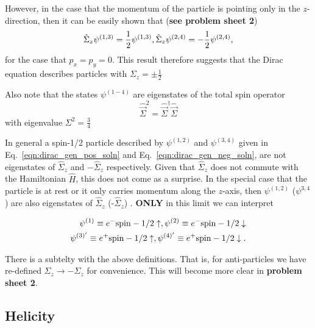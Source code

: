 However, in the case that the momentum of the particle is pointing only in the $z$-direction, then 
it can be easily shown that ({\bf see problem sheet 2})
\[
\hat{\Sigma}_{z}\psi^{(1,3)}=\frac{1}{2}\psi^{(1,3)},\\
\hat{\Sigma}_{z}\psi^{(2,4)}=-\frac{1}{2}\psi^{(2,4)},
\]
for the case that $p_x=p_y=0$. This result therefore suggests that the Dirac equation describes particles with $\Sigma_{z}=\pm\frac{1}{2}$

Also note that the states  $\psi^{(1-4)}$ are eigenstates of the total spin operator
\[
\hat{\vec{\Sigma}}^2=\hat{\vec{\Sigma}}^{\dagger}\hat{\vec{\Sigma}}
\]
with eigenvalue $\Sigma^2=\frac{3}{4}$


In general a spin-1/2 particle described by $\psi^{(1,2)}$ and $\psi^{(3,4)}$ given
in Eq.~\ref{eqn:dirac_gen_pos_soln} and Eq.~\ref{eqn:dirac_gen_neg_soln}, are not
eigenstates of $\hat{\Sigma}_z$ and $-\hat{\Sigma}_z$ respectively.
Given that $\hat{\Sigma}_{z}$ does not commute with the Hamiltonian $\hat{H}$,
this does not come as a surprise. In the special case
that the particle is at rest or it only carries momentum along the $z$-axis,
then $\psi^{(1,2)}$ ($\psi^{3,4}$) are also eigenstates of $\hat{\Sigma}_z$ (-$\hat{\Sigma}_z$) . {
\bf ONLY} in this limit we can interpret

\begin{eqnarray*}
\psi^{(1)}\equiv e^- {\rm spin}-1/2 \uparrow,
\psi^{(2)}\equiv e^- {\rm spin}-1/2 \downarrow\\
\psi^{(3)'}\equiv e^+ {\rm spin}-1/2 \uparrow,
\psi^{(4)'}\equiv e^+ {\rm spin}-1/2 \downarrow.
\end{eqnarray*}

There is a subtelty with the above definitions. That is, for
anti-particles we have re-defined $\Sigma_z\to -\Sigma_z$ for convenience.
This will become more clear in {\bf problem sheet 2}.

\subsection{Helicity}
\label{sec:helicity}


